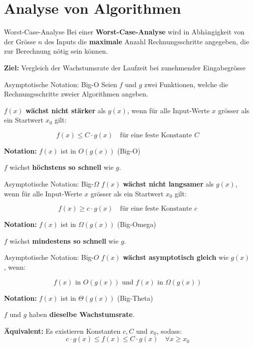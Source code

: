 \documentclass[a4paper, fontsize=7pt]{scrartcl}
\begin{document}
\section{Analyse von Algorithmen}

\begin{mainbox}{Worst-Case-Analyse}
Bei einer \textbf{Worst-Case-Analyse} wird in Abhängigkeit von der Grösse $n$ des Inputs die \textbf{maximale} Anzahl Rechnungsschritte angegeben, die zur Berechnung nötig sein können.

\textbf{Ziel:} Vergleich der Wachstumsrate der Laufzeit bei zunehmender Eingabegrösse
\end{mainbox}

\begin{mainbox}{Asymptotische Notation: Big-O}
Seien $f$ und $g$ zwei Funktionen, welche die Rechnungsschritte zweier Algorithmen angeben.

$f(x)$ \textbf{wächst nicht stärker} als $g(x)$, wenn für alle Input-Werte $x$ grösser als ein Startwert $x_0$ gilt:

\[f(x) \leq C \cdot g(x) \quad \text{für eine feste Konstante } C\]

\textbf{Notation:} $f(x)$ ist in $O(g(x))$ (Big-O)

$f$ wächst \textbf{höchstens so schnell} wie $g$.
\end{mainbox}

\begin{mainbox}{Asymptotische Notation: Big-$\Omega$}
$f(x)$ \textbf{wächst nicht langsamer} als $g(x)$, wenn für alle Input-Werte $x$ grösser als ein Startwert $x_0$ gilt:

\[f(x) \geq c \cdot g(x) \quad \text{für eine feste Konstante } c\]

\textbf{Notation:} $f(x)$ ist in $\Omega(g(x))$ (Big-Omega)

$f$ wächst \textbf{mindestens so schnell} wie $g$.
\end{mainbox}

\begin{mainbox}{Asymptotische Notation: Big-$O$}
$f(x)$ \textbf{wächst asymptotisch gleich} wie $g(x)$, wenn:

$$f(x) \text{ in } O(g(x)) \text{ und } f(x) \text{ in } \Omega(g(x))$$

\textbf{Notation:} $f(x)$ ist in $\Theta(g(x))$ (Big-Theta)

$f$ und $g$ haben \textbf{dieselbe Wachstumsrate}.

\textbf{Äquivalent:} Es existieren Konstanten $c, C$ und $x_0$, sodass:
$$c \cdot g(x) \leq f(x) \leq C \cdot g(x) \quad \forall x \geq x_0$$
\end{mainbox}
\end{document}
